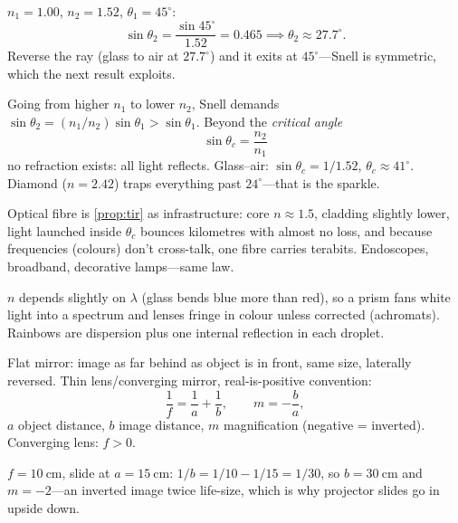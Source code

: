 \begin{example}\label{exm:snell}
$n_1 = 1.00$, $n_2 = 1.52$, $\theta_1 = 45^\circ$:
\[
  \sin\theta_2 = \frac{\sin 45^\circ}{1.52} = 0.465 \implies \theta_2 \approx 27.7^\circ.
\]
Reverse the ray (glass to air at $27.7^\circ$) and it exits at $45^\circ$---Snell is symmetric, which the next result exploits.
\end{example}

\begin{proposition}\label{prop:tir}
Going from higher $n_1$ to lower $n_2$, Snell demands $\sin\theta_2 = (n_1/n_2)\sin\theta_1 > \sin\theta_1$. Beyond the \emph{critical angle}
\begin{equation}\label{eq:critical}
  \sin\theta_c = \frac{n_2}{n_1}
\end{equation}
no refraction exists: all light reflects. Glass--air: $\sin\theta_c = 1/1.52$, $\theta_c \approx 41^\circ$. Diamond ($n = 2.42$) traps everything past $24^\circ$---that is the sparkle.
\end{proposition}

Optical fibre is \cref{prop:tir} as infrastructure: core $n \approx 1.5$, cladding slightly lower, light launched inside $\theta_c$ bounces kilometres with almost no loss, and because frequencies (colours) don't cross-talk, one fibre carries terabits. Endoscopes, broadband, decorative lamps---same law.

\begin{remark}[Dispersion]\label{rmk:dispersion}
$n$ depends slightly on $\lambda$ (glass bends blue more than red), so a prism fans white light into a spectrum and lenses fringe in colour unless corrected (achromats). Rainbows are dispersion plus one internal reflection in each droplet.
\end{remark}

\begin{proposition}\label{prop:lens}
Flat mirror: image as far behind as object is in front, same size, laterally reversed. Thin lens/converging mirror, real-is-positive convention:
\begin{equation}\label{eq:lens}
  \frac{1}{f} = \frac{1}{a} + \frac{1}{b}, \qquad m = -\frac{b}{a},
\end{equation}
$a$ object distance, $b$ image distance, $m$ magnification (negative = inverted). Converging lens: $f > 0$.
\end{proposition}

\begin{example}\label{exm:lens}
$f = 10\ \mathrm{cm}$, slide at $a = 15\ \mathrm{cm}$: $1/b = 1/10 - 1/15 = 1/30$, so $b = 30\ \mathrm{cm}$ and $m = -2$---an inverted image twice life-size, which is why projector slides go in upside down.
\end{example}

